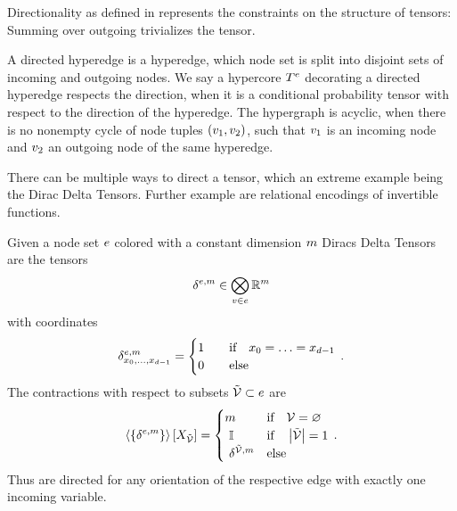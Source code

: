 Directionality as defined in  represents the constraints on the structure of tensors:
Summing over outgoing trivializes the tensor.


\begin{definition}
	A directed hyperedge is a hyperedge, which node set is split into disjoint sets of incoming and outgoing nodes.
	We say a hypercore $T^{e}$ decorating a directed hyperedge respects the direction, when it is a conditional probability tensor with respect to the direction of the hyperedge. 
	The hypergraph is acyclic, when there is no nonempty cycle of node tuples $(v_1,v_2)$, such that $v_1$ is an incoming node and $v_2$ an outgoing node of the same hyperedge.
\end{definition}



There can be multiple ways to direct a tensor, which an extreme example being the Dirac Delta Tensors.
Further example are relational encodings of invertible functions.

\begin{example}
	Given a node set $e$ colored with a constant dimension $m$ Diracs Delta Tensors are the tensors
		\[ \delta^{e,m} \in \bigotimes_{v\in e} \mathbb{R}^{m} \]
	with coordinates
	\begin{align}
		\delta^{e,m}_{x_{0},\ldots,x_{d-1}} = 
		\begin{cases}
			1 \quad & \text{if} \quad x_{0} = \ldots = x_{d-1} \\
			0 & \text{else}
		\end{cases} \, . 
	\end{align}
	The contractions with respect to subsets $\tilde{\mathcal{V}} \subset e$ are
	\begin{align}
		\contractionof{\{\dirdeltaof{\edge,\catdim}\}}{\catvariableof{\secnodes}} = 
		\begin{cases}
			\catdim & \text{if} \quad \nodes = \varnothing \\ 
			\ones & \text{if} \quad \cardof{\secnodes} = 1\\ 
			\dirdeltaof{\secnodes,\catdim} & \text{else}
		\end{cases} \, .
	\end{align}
	Thus are directed for any orientation of the respective edge with exactly one incoming variable.
\end{example}




